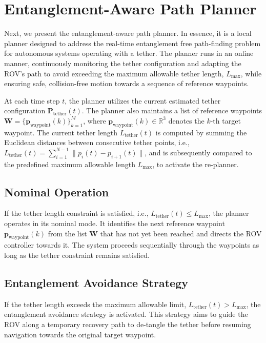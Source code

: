 





\section{Entanglement-Aware Path Planner}
\label{sec:planner}

Next, we present the entanglement-aware path planner. In essence, it is a local planner designed to address the real-time entanglement free path-finding problem for autonomous systems operating with a tether. 
The planner runs in an online manner, continuously monitoring the tether configuration and adapting the \ac{ROV}'s path to avoid exceeding the maximum allowable tether length, \( L_{\mathrm{max}} \), while ensuring safe, collision-free motion towards a sequence of reference waypoints.

At each time step \( t \), the planner utilizes the current estimated tether configuration  $\mathbf{P}_{\mathrm{tether}}(t)$. The planner also maintains a list of reference waypoints \( \mathbf{W} = \{\mathbf{p}_{\text{waypoint}}(k)\}_{k=1}^{M} \), where \( \mathbf{p}_{\text{waypoint}}(k) \in \mathbb{R}^3 \) denotes the \( k \)-th target waypoint. The current tether length \( L_{\text{tether}}(t) \) is computed by summing the Euclidean distances between consecutive tether points, i.e., \( L_{\text{tether}}(t) = \sum_{i=1}^{N-1} \| p_i(t) - p_{i+1}(t) \| \), and is subsequently compared to the predefined maximum allowable length \( L_{\text{max}} \), to activate the re-planner.

\subsection{Nominal Operation}
If the tether length constraint is satisfied, i.e., \( L_{\text{tether}}(t) \leq L_{\text{max}} \), the planner operates in its nominal mode. It identifies the next reference waypoint \( \mathbf{p}_{\text{waypoint}}(k) \) from the list \( \mathbf{W} \) that has not yet been reached and directs the \ac{ROV} controller towards it. The system proceeds sequentially through the waypoints as long as the tether constraint remains satisfied.



\subsection{Entanglement Avoidance Strategy}
If the tether length exceeds the maximum allowable limit, \( L_{\text{tether}}(t) > L_{\text{max}} \), the entanglement avoidance strategy is activated. This strategy aims to guide the \ac{ROV} along a temporary recovery path to de-tangle the tether before resuming navigation towards the original target waypoint.

